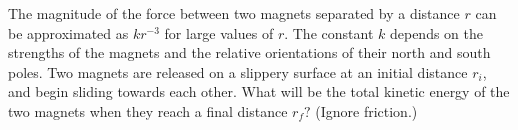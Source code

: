 The magnitude of the force between two magnets
separated by a distance $r$ can be approximated as $kr^{-3}$ for
large values of $r$. The constant $k$ depends on the
strengths of the magnets and the relative orientations of
their north and south poles. Two magnets are released on a
slippery surface at an initial distance $r_i$, and begin
sliding towards each other. What will be the total kinetic
energy of the two magnets when they reach a final distance
$r_f?$ (Ignore friction.)
\answercheck
